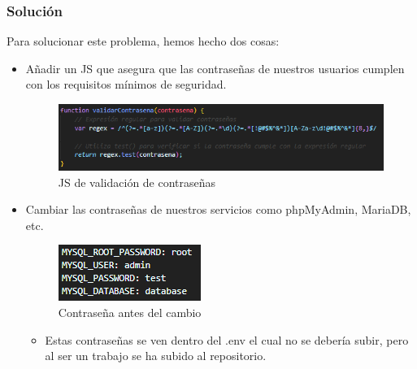 \documentclass{report}
\begin{document}
                \subsubsection{Solución}
                    Para solucionar este problema, hemos hecho dos cosas:
                    \begin{itemize}
                        \item Añadir un JS que asegura que las contraseñas de nuestros usuarios cumplen con los requisitos mínimos de seguridad.
                        \begin{figure}[H]
                            \centering
                            \includegraphics[width=\textwidth]{./img/vulnerabilidades/3.7/2.1.png}
                            \caption{JS de validación de contraseñas}
                        \end{figure}
                        \item Cambiar las contraseñas de nuestros servicios como phpMyAdmin, MariaDB, etc.
                        \begin{figure}[H]
                            \centering
                            \includegraphics[width=\textwidth]{./img/vulnerabilidades/3.7/2.2.png}
                            \caption{Contraseña antes del cambio}                            
                        \end{figure}
                        \begin{itemize}
                            \item Estas contraseñas se ven dentro del .env el cual no se debería subir, pero al ser un trabajo se ha subido al repositorio.
                        \end{itemize}
                    \end{itemize}
            \clearpage
\end{document}
